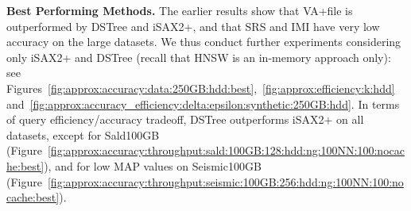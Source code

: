 {{ 	

{\color{black} \noindent\textbf{Best Performing Methods.}} The earlier results show that VA+file is 
outperformed by DSTree and iSAX2+, and that SRS and IMI have very low accuracy on the large datasets. 
We thus conduct further experiments considering only iSAX2+ and DSTree (recall that HNSW is an in-memory approach only): %
see Figures~\ref{fig:approx:accuracy:data:250GB:hdd:best},~\ref{fig:approx:efficiency:k:hdd} and~\ref{fig:approx:accuracy_efficiency:delta:epsilon:synthetic:250GB:hdd}.%
In terms of query efficiency/accuracy tradeoff, DSTree outperforms iSAX2+ on all datasets, except for Sald100GB (Figure~\ref{fig:approx:accuracy:throughput:sald:100GB:128:hdd:ng:100NN:100:nocache:best}), and for low MAP values on Seismic100GB (Figure~\ref{fig:approx:accuracy:throughput:seismic:100GB:256:hdd:ng:100NN:100:nocache:best}). 

}}
